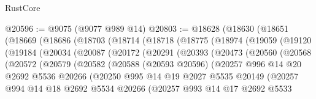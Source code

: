 \begin{lexlean}{RustCore}
\begin{coremodule}
@20596 := @9075 (@9077 @989 @14)
@20803 := @18628
    (@18630
      (@18651
        (@18669
          (@18686
            (@18703
              (@18714
                (@18718
                  (@18775
                    (@18974
                      (@19059
                        (@19120
                          (@19184
                            (@20034
                              (@20087
                                (@20172
                                  (@20291
                                    (@20393
                                      (@20473
                                        (@20560
                                          (@20568
                                            (@20572
                                              (@20579
                                                (@20582
                                                  (@20588
                                                    (@20593 @20596)
                                                    (@20257
                                                      @996
                                                      @14
                                                      @20
                                                      @2692
                                                      @5536
                                                      @20266
                                                      (@20250
                                                        @995
                                                        @14
                                                        @19
                                                        @2027
                                                        @5535
                                                        @20149
                                                        (@20257
                                                          @994
                                                          @14
                                                          @18
                                                          @2692
                                                          @5534
                                                          @20266
                                                          (@20257
                                                            @993
                                                            @14
                                                            @17
                                                            @2692
                                                            @5533

\end{coremodule}
\end{lexlean}
